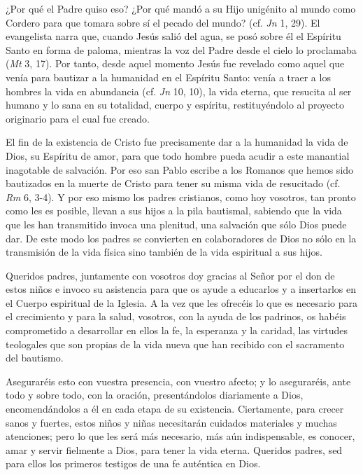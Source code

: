 \begin{body}
\begin{body}
{¿Por qué el Padre quiso eso? ¿Por qué mandó a su Hijo unigénito al mundo como Cordero para que tomara sobre sí el pecado del mundo? (cf. \emph{Jn} 1, 29). El evangelista narra que, cuando Jesús salió del agua, se posó sobre él el Espíritu Santo en forma de paloma, mientras la voz del Padre desde el cielo lo proclamaba  (\emph{Mt} 3, 17). Por tanto, desde aquel momento Jesús fue revelado como aquel que venía para bautizar a la humanidad en el Espíritu Santo: venía a traer a los hombres la vida en abundancia (cf. \emph{Jn} 10, 10), la vida eterna, que resucita al ser humano y lo sana en su totalidad, cuerpo y espíritu, restituyéndolo al proyecto originario para el cual fue creado.

El fin de la existencia de Cristo fue precisamente dar a la humanidad la vida de Dios, su Espíritu de amor, para que todo hombre pueda acudir a este manantial inagotable de salvación. Por eso san Pablo escribe a los Romanos que hemos sido bautizados en la muerte de Cristo para tener su misma vida de resucitado (cf. \emph{Rm} 6, 3-4). Y por eso mismo los padres cristianos, como hoy vosotros, tan pronto como les es posible, llevan a sus hijos a la pila bautismal, sabiendo que la vida que les han transmitido invoca una plenitud, una salvación que sólo Dios puede dar. De este modo los padres se convierten en colaboradores de Dios no sólo en la transmisión de la vida física sino también de la vida espiritual a sus hijos.

Queridos padres, juntamente con vosotros doy gracias al Señor por el don de estos niños e invoco su asistencia para que os ayude a educarlos y a insertarlos en el Cuerpo espiritual de la Iglesia. A la vez que les ofrecéis lo que es necesario para el crecimiento y para la salud, vosotros, con la ayuda de los padrinos, os habéis comprometido a desarrollar en ellos la fe, la esperanza y la caridad, las virtudes teologales que son propias de la vida nueva que han recibido con el sacramento del bautismo.

Aseguraréis esto con vuestra presencia, con vuestro afecto; y lo aseguraréis, ante todo y sobre todo, con la oración, presentándolos diariamente a Dios, encomendándolos a él en cada etapa de su existencia. Ciertamente, para crecer sanos y fuertes, estos niños y niñas necesitarán cuidados materiales y muchas atenciones; pero lo que les será más necesario, más aún indispensable, es conocer, amar y servir fielmente a Dios, para tener la vida eterna. Queridos padres, sed para ellos los primeros testigos de una fe auténtica en Dios.

}
\end{body}
\end{body}
